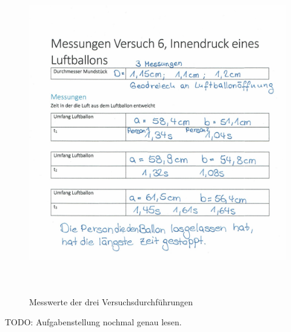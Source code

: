 \documentclass{article}
\begin{document}
    \begin{figure}[!h]\label{fig:Messwerte}
        \centering
        \includegraphics[height=14cm]{messwerte.jpg}
        \caption{Messwerte der drei Versuchsdurchführungen}
    \end{figure}

    TODO: Aufgabenstellung nochmal genau lesen.
    
\end{document}
